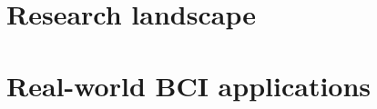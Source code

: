 








\section{Research landscape}
\label{chapter2-research-landscape}


\section{Real-world BCI applications}
\label{chapter2-real-world-bci-applications}






